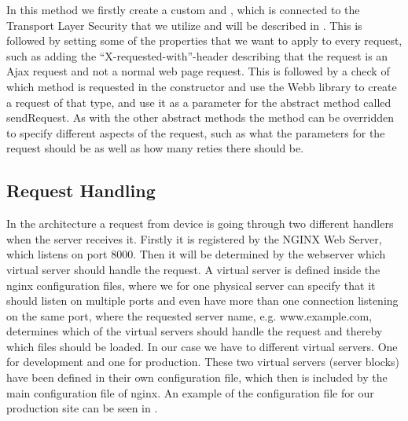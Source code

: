 

In this method we firstly create a custom  and , which is connected to the Transport Layer Security that we utilize and will be described in . This is followed by setting some of the properties that we want to apply to every request, such as adding the ``X-requested-with''-header describing that the request is an Ajax request and not a normal web page request. This is followed by a check of which method is requested in the constructor and use the Webb library to create a request of that type, and use it as a parameter for the abstract method called sendRequest. As with the other abstract methods the  method can be overridden to specify different aspects of the request, such as what the parameters for the request should be as well as how many reties there should be.

\subsection{Request Handling}
\label{sub:request_handling}
In the architecture a request from device is going through two different handlers when the server receives it. Firstly it is registered by the NGINX Web Server, which listens on port 8000. Then it will be determined by the webserver which virtual server should handle the request. A virtual server is defined inside the nginx configuration files, where we for one physical server can specify that it should listen on multiple ports and even have more than one connection listening on the same port, where the requested server name, e.g. www.example.com, determines which of the virtual servers should handle the request and thereby which files should be loaded. In our case we have to different virtual servers. One for development and one for production. These two virtual servers (server blocks) have been defined in their own configuration file, which then is included by the main configuration file of nginx. An example of the configuration file for our production site can be seen in . 



